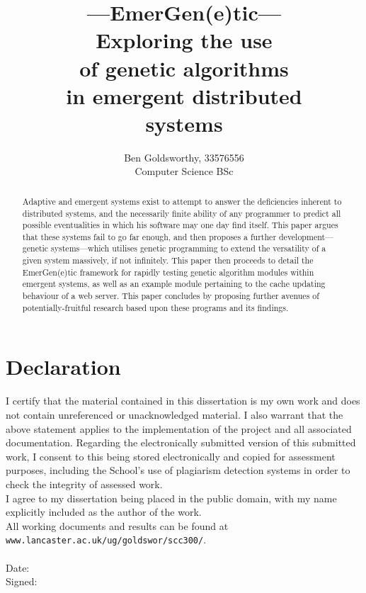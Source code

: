 \documentclass[compsoc,12pt,a4paper]{IEEEtran}
\begin{document}
	
	\title{\vspace{8.0cm}---EmerGen(e)tic---\\Exploring the use\\of genetic algorithms\\in emergent distributed\\systems}
	
	\author{\vspace{2.0cm}Ben Goldsworthy, 33576556\\Computer Science BSc}
	
	\maketitle
	
	\onecolumn

	\section*{Declaration}
	
		I certify that the material contained in this dissertation is my own work and does not contain unreferenced or unacknowledged material. I also warrant that the above statement applies to the implementation of the project and all associated documentation. Regarding the electronically submitted version of this submitted work, I consent to this being stored electronically and copied for assessment purposes, including the School's use of plagiarism detection systems in order to check the integrity of assessed work.\\
		I agree to my dissertation being placed in the public domain, with my name explicitly included as the author of the work.\\
		All working documents and results can be found at \lstinline|www.lancaster.ac.uk/ug/goldswor/scc300/|.\\\\
		Date:\\
		Signed:
		

	\newpage

	\begin{abstract}
		Adaptive and emergent systems exist to attempt to answer the deficiencies inherent to distributed systems, and the necessarily finite ability of any programmer to predict all possible eventualities in which his software may one day find itself. This paper argues that these systems fail to go far enough, and then proposes a further development---genetic systems---which utilises genetic programming to extend the versatility of a given system massively, if not infinitely. This paper then proceeds to detail the EmerGen(e)tic framework for rapidly testing genetic algorithm modules within emergent systems, as well as an example module pertaining to the cache updating behaviour of a web server. This paper concludes by proposing further avenues of potentially-fruitful research based upon these programs and its findings.
	\end{abstract}
	
\end{document}
